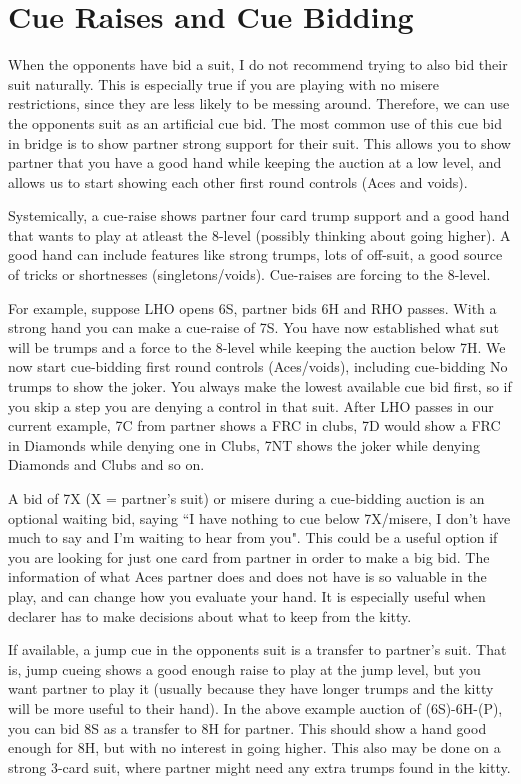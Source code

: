 \documentclass[a4paper]{JoshCards}
\begin{document}
\newpage 

\section*{Cue Raises and Cue Bidding}

When the opponents have bid a suit, I do not recommend trying to also bid their suit naturally. This is especially true if you are playing with no misere restrictions, since they are less likely to be messing around. Therefore, we can use the opponents suit as an artificial cue bid. The most common use of this cue bid in bridge is to show partner strong support for their suit. This allows you to show partner that you have a good hand while keeping the auction at a low level, and allows us to start showing each other first round controls (Aces and voids). 

Systemically, a cue-raise shows partner four card trump support and a good hand that wants to play at atleast the 8-level (possibly thinking about going higher). A good hand can include features like strong trumps, lots of off-suit, a good source of tricks or shortnesses (singletons/voids). Cue-raises are forcing to the 8-level.

For example, suppose LHO opens 6S, partner bids 6H and RHO passes. With a strong hand you can make a cue-raise of 7S. You have now established what sut will be trumps and a force to the 8-level while keeping the auction below 7H. We now start cue-bidding first round controls (Aces/voids), including cue-bidding No trumps to show the joker. You always make the lowest available cue bid first, so if you skip a step you are denying a control in that suit. After LHO passes in our current example, 7C from partner shows a FRC in clubs, 7D would show a FRC in Diamonds while denying one in Clubs, 7NT shows the joker while denying Diamonds and Clubs and so on.

A bid of 7X (X = partner's suit) or misere during a cue-bidding auction is an optional waiting bid, saying ``I have nothing to cue below 7X/misere, I don't have much to say and I'm waiting to hear from you". This could be a useful option if you are looking for just one card from partner in order to make a big bid. The information of what Aces partner does and does not have is so valuable in the play, and can change how you evaluate your hand. It is especially useful when declarer has to make decisions about what to keep from the kitty.

If available, a jump cue in the opponents suit is a transfer to partner's suit. That is, jump cueing shows a good enough raise to play at the jump level, but you want partner to play it (usually because they have longer trumps and the kitty will be more useful to their hand). In the above example auction of (6S)-6H-(P), you can bid 8S as a transfer to 8H for partner. This should show a hand good enough for 8H, but with no interest in going higher. This also may be done on a strong 3-card suit, where partner might need any extra trumps found in the kitty.
\end{document}
